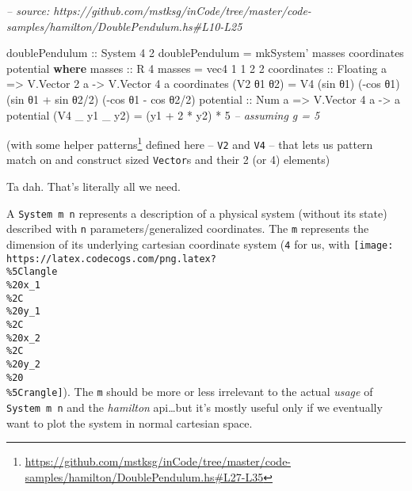 \documentclass[]{article}
\newenvironment{Shaded}{}{}
\newcommand{\CommentTok}[1]{\textcolor[rgb]{0.38,0.63,0.69}{\textit{#1}}}
\newcommand{\DataTypeTok}[1]{\textcolor[rgb]{0.56,0.13,0.00}{#1}}
\newcommand{\DecValTok}[1]{\textcolor[rgb]{0.25,0.63,0.44}{#1}}
\newcommand{\FunctionTok}[1]{\textcolor[rgb]{0.02,0.16,0.49}{#1}}
\newcommand{\KeywordTok}[1]{\textcolor[rgb]{0.00,0.44,0.13}{\textbf{#1}}}
\newcommand{\NormalTok}[1]{#1}
\newcommand{\OtherTok}[1]{\textcolor[rgb]{0.00,0.44,0.13}{#1}}
\renewcommand{\href}[2]{#2\footnote{\url{#1}}}
\begin{document}
\begin{Shaded}
\begin{Highlighting}[]
\CommentTok{-- source: https://github.com/mstksg/inCode/tree/master/code-samples/hamilton/DoublePendulum.hs#L10-L25}

\OtherTok{doublePendulum ::} \DataTypeTok{System} \DecValTok{4} \DecValTok{2}
\NormalTok{doublePendulum }\FunctionTok{=}\NormalTok{ mkSystem' masses coordinates potential}
  \KeywordTok{where}
\OtherTok{    masses ::} \DataTypeTok{R} \DecValTok{4}
\NormalTok{    masses }\FunctionTok{=}\NormalTok{ vec4 }\DecValTok{1} \DecValTok{1} \DecValTok{2} \DecValTok{2}
\NormalTok{    coordinates}
\OtherTok{        ::} \DataTypeTok{Floating}\NormalTok{ a}
        \OtherTok{=>} \DataTypeTok{V.Vector} \DecValTok{2}\NormalTok{ a}
        \OtherTok{->} \DataTypeTok{V.Vector} \DecValTok{4}\NormalTok{ a}
\NormalTok{    coordinates (}\DataTypeTok{V2}\NormalTok{ θ1 θ2) }\FunctionTok{=} \DataTypeTok{V4}\NormalTok{ (sin θ1)            (}\FunctionTok{-}\NormalTok{cos θ1)}
\NormalTok{                                (sin θ1 }\FunctionTok{+}\NormalTok{ sin θ2}\FunctionTok{/}\DecValTok{2}\NormalTok{) (}\FunctionTok{-}\NormalTok{cos θ1 }\FunctionTok{-}\NormalTok{ cos θ2}\FunctionTok{/}\DecValTok{2}\NormalTok{)}
\NormalTok{    potential}
\OtherTok{        ::} \DataTypeTok{Num}\NormalTok{ a}
        \OtherTok{=>} \DataTypeTok{V.Vector} \DecValTok{4}\NormalTok{ a}
        \OtherTok{->}\NormalTok{ a}
\NormalTok{    potential (}\DataTypeTok{V4}\NormalTok{ _ y1 _ y2) }\FunctionTok{=}\NormalTok{ (y1 }\FunctionTok{+} \DecValTok{2} \FunctionTok{*}\NormalTok{ y2) }\FunctionTok{*} \DecValTok{5}    \CommentTok{-- assuming g = 5}
\end{Highlighting}
\end{Shaded}

(with some
\href{https://github.com/mstksg/inCode/tree/master/code-samples/hamilton/DoublePendulum.hs\#L27-L35}{helper
patterns} defined here -- \texttt{V2} and \texttt{V4} -- that lets us pattern
match on and construct sized \texttt{Vector}s and their 2 (or 4) elements)

Ta dah. That's literally all we need.

A \texttt{System\ m\ n} represents a description of a physical system (without
its state) described with \texttt{n} parameters/generalized coordinates. The
\texttt{m} represents the dimension of its underlying cartesian coordinate
system (\texttt{4} for us, with
\texttt{[image: https://latex.codecogs.com/png.latex?\\\%5Clangle\\\%20x\_1\\\%2C\\\%20y\_1\\\%2C\\\%20x\_2\\\%2C\\\%20y\_2\\\%20\\\%5Crangle]}).
The \texttt{m} should be more or less irrelevant to the actual \emph{usage} of
\texttt{System\ m\ n} and the \emph{hamilton} api\ldots{}but it's mostly useful
only if we eventually want to plot the system in normal cartesian space.
\end{document}
